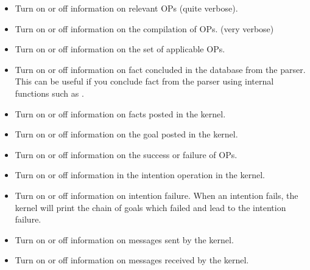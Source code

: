 \begin{itemize}

\item {} Turn on or off information on relevant
OPs (quite verbose).

\item {} Turn on or off information on the
compilation of OPs. (very verbose)

\item {} Turn on or off information on the set of
applicable OPs.

\item {} Turn on or off information on fact concluded
in the database from the parser. This can be useful if you conclude fact from
the parser using internal functions such as .

\item {} Turn on or off information on facts
posted in the kernel.

\item {} Turn on or off information on the goal
posted in the kernel.

\item {} Turn on or off information on the
success or failure of OPs.

\item {} Turn on or off information in the
intention operation in the kernel.

\item {} Turn on or off information on
intention failure. When an intention fails, the kernel will print the chain of
goals which failed and lead to the intention failure. 

\item {} Turn on or off information on messages sent
by the kernel.

\item {} Turn on or off information on messages
received by the kernel.


\end{itemize}
